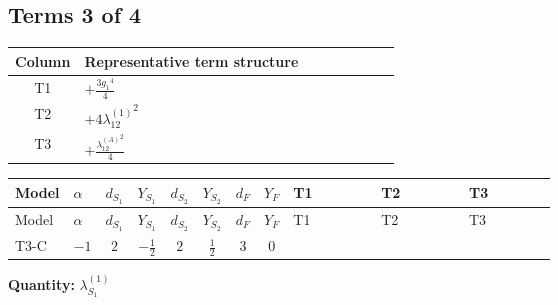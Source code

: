 \documentclass[8pt]{article}
\begin{document}
\begin{landscape}
\subsection*{Terms 3 of 4}
\begin{center}
\begin{tabular}{@{}c >{\raggedright\arraybackslash}p{0.82\linewidth}@{}}
\toprule
Column & Representative term structure \\
\midrule
T1 & \(\displaystyle +\frac{3 {g_1}^4}{4}\) \\
\midrule
T2 & \(\displaystyle +4 {\lambda_{12}^{(1)}}^2\) \\
\midrule
T3 & \(\displaystyle +\frac{{\lambda_{12}^{(A)}}^2}{4}\) \\
\midrule
\bottomrule
\end{tabular}
\end{center}
\smallskip
\tiny
\begin{longtable}{@{}llcccccc >{\raggedright\arraybackslash}p{0.21\linewidth} >{\raggedright\arraybackslash}p{0.21\linewidth} >{\raggedright\arraybackslash}p{0.21\linewidth}@{}}
\toprule
Model & $\alpha$ & $d_{S_1}$ & $Y_{S_1}$ & $d_{S_2}$ & $Y_{S_2}$ & $d_F$ & $Y_F$ & T1 & T2 & T3 \\
\midrule
\endfirsthead
\toprule
Model & $\alpha$ & $d_{S_1}$ & $Y_{S_1}$ & $d_{S_2}$ & $Y_{S_2}$ & $d_F$ & $Y_F$ & T1 & T2 & T3 \\
\midrule
\endhead
T3-C & $-1$ & $2$ & $-\frac{1}{2}$ & $2$ & $\frac{1}{2}$ & $3$ & $0$ & \scriptsize\adjustbox{max width=\linewidth}{$\begin{gathered} +\frac{3 {g_1}^4}{4}\end{gathered}$} & \scriptsize\adjustbox{max width=\linewidth}{$\begin{gathered} +4 {\lambda_{12}^{(1)}}^2\end{gathered}$} & \scriptsize\adjustbox{max width=\linewidth}{$\begin{gathered} +\frac{{\lambda_{12}^{(A)}}^2}{4}\end{gathered}$} \\
\midrule
\bottomrule
\end{longtable}
\clearpage
\noindent\textbf{Quantity: }$\lambda_{S_1}^{(1)}$\par\smallskip

\end{landscape}
\end{document}
